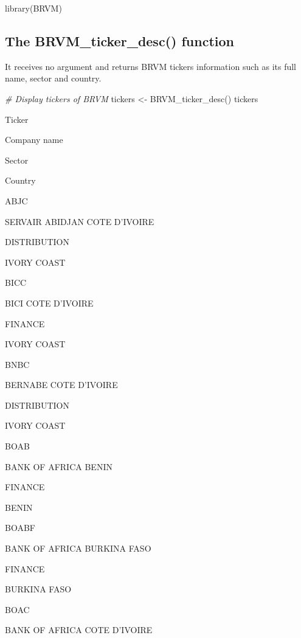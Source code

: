 \documentclass[
]{article}
\newenvironment{Shaded}{\begin{snugshade}}{\end{snugshade}}
\newcommand{\CommentTok}[1]{\textcolor[rgb]{0.56,0.35,0.01}{\textit{#1}}}
\newcommand{\FunctionTok}[1]{\textcolor[rgb]{0.00,0.00,0.00}{#1}}
\newcommand{\NormalTok}[1]{#1}
\newcommand{\OtherTok}[1]{\textcolor[rgb]{0.56,0.35,0.01}{#1}}
\begin{document}
\begin{Shaded}
\begin{Highlighting}[]
\FunctionTok{library}\NormalTok{(BRVM)}
\end{Highlighting}
\end{Shaded}

\hypertarget{the-brvm_ticker_desc-function}{%
\subsection{\texorpdfstring{The \textbf{BRVM\_ticker\_desc()}
function}{The BRVM\_ticker\_desc() function}}\label{the-brvm_ticker_desc-function}}

It receives no argument and returns BRVM tickers information such as its
full name, sector and country.

\begin{Shaded}
\begin{Highlighting}[]
\CommentTok{\# Display tickers of BRVM}
\NormalTok{tickers }\OtherTok{\textless{}{-}} \FunctionTok{BRVM\_ticker\_desc}\NormalTok{()}
\NormalTok{tickers}
\end{Highlighting}
\end{Shaded}

Ticker

Company name

Sector

Country

ABJC

SERVAIR ABIDJAN COTE D'IVOIRE

DISTRIBUTION

IVORY COAST

BICC

BICI COTE D'IVOIRE

FINANCE

IVORY COAST

BNBC

BERNABE COTE D'IVOIRE

DISTRIBUTION

IVORY COAST

BOAB

BANK OF AFRICA BENIN

FINANCE

BENIN

BOABF

BANK OF AFRICA BURKINA FASO

FINANCE

BURKINA FASO

BOAC

BANK OF AFRICA COTE D'IVOIRE
\end{document}
